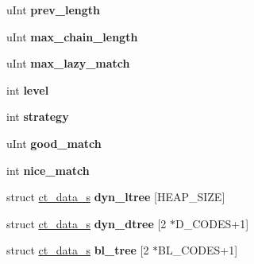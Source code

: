 \begin{DoxyCompactItemize}
\item 
u\+Int {\bfseries prev\+\_\+length}\hypertarget{structinternal__state_a7619fb70f9f66ff21b419b8ceac4904c}{}\label{structinternal__state_a7619fb70f9f66ff21b419b8ceac4904c}

\item 
u\+Int {\bfseries max\+\_\+chain\+\_\+length}\hypertarget{structinternal__state_ab1ffa7feb159edec170574813fae3279}{}\label{structinternal__state_ab1ffa7feb159edec170574813fae3279}

\item 
u\+Int {\bfseries max\+\_\+lazy\+\_\+match}\hypertarget{structinternal__state_ab74215ec1c106bf588a7642927d47b84}{}\label{structinternal__state_ab74215ec1c106bf588a7642927d47b84}

\item 
int {\bfseries level}\hypertarget{structinternal__state_a7ad2ab1df80c8cab4ffb97ff84e88c62}{}\label{structinternal__state_a7ad2ab1df80c8cab4ffb97ff84e88c62}

\item 
int {\bfseries strategy}\hypertarget{structinternal__state_a67219312df7fd2f86e06e6f14700eb28}{}\label{structinternal__state_a67219312df7fd2f86e06e6f14700eb28}

\item 
u\+Int {\bfseries good\+\_\+match}\hypertarget{structinternal__state_a68ba00254242017f330dca5e0191bca4}{}\label{structinternal__state_a68ba00254242017f330dca5e0191bca4}

\item 
int {\bfseries nice\+\_\+match}\hypertarget{structinternal__state_a39ab99e52138c0628f645bc1e0c69a04}{}\label{structinternal__state_a39ab99e52138c0628f645bc1e0c69a04}

\item 
struct \hyperlink{structct__data__s}{ct\+\_\+data\+\_\+s} {\bfseries dyn\+\_\+ltree} \mbox{[}H\+E\+A\+P\+\_\+\+S\+I\+ZE\mbox{]}\hypertarget{structinternal__state_ae11867c05d54c575dbc713bbea71266c}{}\label{structinternal__state_ae11867c05d54c575dbc713bbea71266c}

\item 
struct \hyperlink{structct__data__s}{ct\+\_\+data\+\_\+s} {\bfseries dyn\+\_\+dtree} \mbox{[}2 $\ast$D\+\_\+\+C\+O\+D\+ES+1\mbox{]}\hypertarget{structinternal__state_a42a52476d3cde41e57a6ef2a6a78008f}{}\label{structinternal__state_a42a52476d3cde41e57a6ef2a6a78008f}

\item 
struct \hyperlink{structct__data__s}{ct\+\_\+data\+\_\+s} {\bfseries bl\+\_\+tree} \mbox{[}2 $\ast$B\+L\+\_\+\+C\+O\+D\+ES+1\mbox{]}\hypertarget{structinternal__state_a98131fc5b64d0d7542bc3621aef19854}{}\label{structinternal__state_a98131fc5b64d0d7542bc3621aef19854}


\end{DoxyCompactItemize}
